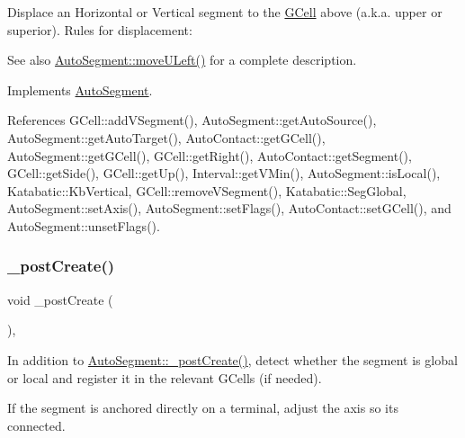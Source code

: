 Displace an Horizontal or Vertical segment to the \mbox{\hyperlink{classKatabatic_1_1GCell}{G\+Cell}} above (a.\+k.\+a. upper or superior). Rules for displacement\+:

\begin{DoxySeeAlso}{See also}
\mbox{\hyperlink{classKatabatic_1_1AutoSegment_af8ca7b17e952f4b599aeeb2f4e5be395}{Auto\+Segment\+::move\+U\+Left()}} for a complete description. 
\end{DoxySeeAlso}


Implements \mbox{\hyperlink{classKatabatic_1_1AutoSegment_ad7fd54ca229fcf5ccd99f87b019b9cbc}{Auto\+Segment}}.



References G\+Cell\+::add\+V\+Segment(), Auto\+Segment\+::get\+Auto\+Source(), Auto\+Segment\+::get\+Auto\+Target(), Auto\+Contact\+::get\+G\+Cell(), Auto\+Segment\+::get\+G\+Cell(), G\+Cell\+::get\+Right(), Auto\+Contact\+::get\+Segment(), G\+Cell\+::get\+Side(), G\+Cell\+::get\+Up(), Interval\+::get\+V\+Min(), Auto\+Segment\+::is\+Local(), Katabatic\+::\+Kb\+Vertical, G\+Cell\+::remove\+V\+Segment(), Katabatic\+::\+Seg\+Global, Auto\+Segment\+::set\+Axis(), Auto\+Segment\+::set\+Flags(), Auto\+Contact\+::set\+G\+Cell(), and Auto\+Segment\+::unset\+Flags().

\mbox{\label{classKatabatic_1_1AutoHorizontal_a3715b38135ca24745f610bebd3407c10}} 
\subsubsection{\texorpdfstring{\+\_\+post\+Create()}{\_postCreate()}}
{\footnotesize\ttfamily void \+\_\+post\+Create (\begin{DoxyParamCaption}{ }\end{DoxyParamCaption})\hspace{0.3cm}{\ttfamily [protected]}, {\ttfamily [virtual]}}

In addition to \mbox{\hyperlink{classKatabatic_1_1AutoSegment_a3715b38135ca24745f610bebd3407c10}{Auto\+Segment\+::\+\_\+post\+Create()}}, detect whether the segment is global or local and register it in the relevant G\+Cells (if needed).

If the segment is anchored directly on a terminal, adjust the axis so it\textquotesingle{}s connected. 

